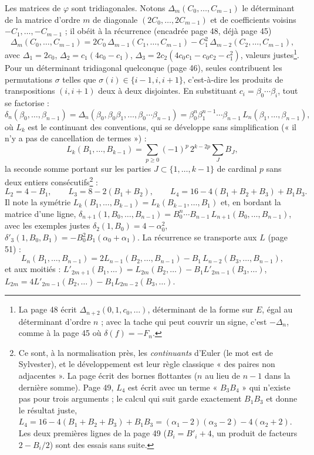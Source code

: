 \documentclass[11pt,a4paper]{article}
\begin{document}
Les matrices de $\varphi$ sont tridiagonales. Notons $\Delta_m(C_0, \ldots,
C_{m-1})$ le déterminant de la matrice d'ordre $m$ de diagonale $(2C_0, \ldots,
2C_{m-1})$ et de coefficients voisins $-C_1, \ldots, -C_{m-1}$ ; il obéit à la
récurrence (encadrée page 48, déjà page 45)
\[
\Delta_m(C_0, \ldots, C_{m-1}) = 2C_0\, \Delta_{m-1}(C_1, \ldots, C_{m-1}) -
C_1^2\, \Delta_{m-2}(C_2, \ldots, C_{m-1}),
\]
avec $\Delta_1 = 2c_0$, $\Delta_2 = c_1(4c_0 - c_1)$, $\Delta_3 = 2c_2(4c_0c_1 -
c_0c_2 - c_1^2)$, valeurs justes\footnote{La page 48 écrit
$\Delta_{n+2}(0, 1, c_0, \ldots)$, déterminant de la forme sur $E$, égal au
déterminant d'ordre $n$ ; avec la tache qui peut couvrir un signe, c'est
$-\Delta_n$, comme à la page 45 où $\delta(f) = -F_n$.}. Pour un déterminant
tridiagonal quelconque (page 46), seules contribuent les permutations $\sigma$
telles que $\sigma(i) \in \{i - 1, i, i + 1\}$, c'est-à-dire les produits de
transpositions $(i, i+1)$ deux à deux disjointes. En substituant $c_i = \beta_0
\cdots \beta_i$, tout se factorise :
\[
\delta_n(\beta_0, \ldots, \beta_{n-1}) = \Delta_n(\beta_0, \beta_0\beta_1,
\ldots, \beta_0 \cdots \beta_{n-1}) = \beta_0^n \beta_1^{n-1} \cdots
\beta_{n-1}\, L_n(\beta_1, \ldots, \beta_{n-1}),
\]
où $L_k$ est le continuant des conventions, qui se développe sans
simplification (« il n'y a pas de cancellation de termes ») :
\[
L_k(B_1, \ldots, B_{k-1}) = \sum_{p \geqslant 0} (-1)^p\, 2^{k - 2p}
\sum_{J} B_J ,
\]
la seconde somme portant sur les parties $J \subset \{1, \ldots, k-1\}$ de
cardinal $p$ sans deux entiers consécutifs\footnote{Ce sont, à la normalisation
près, les \emph{continuants} d'Euler (le mot est de Sylvester), et le
développement est leur règle classique « des paires non adjacentes ». La page
écrit des bornes flottantes ($n$ au lieu de $n-1$ dans la dernière somme).
Page 49, $L_4$ est écrit avec un terme « $B_3B_4$ » qui n'existe pas pour trois
arguments ; le calcul qui suit garde exactement $B_1B_3$ et donne le résultat
juste, $L_4 = 16 - 4(B_1 + B_2 + B_3) + B_1B_3 = (\alpha_1 - 2)(\alpha_3 - 2) -
4(\alpha_2 + 2)$. Les deux premières lignes de la page 49 ($B_i = B'_i + 4$, un
produit de facteurs $2 - B_i/2$) sont des essais sans suite.} :
\[
L_2 = 4 - B_1, \qquad L_3 = 8 - 2(B_1 + B_2), \qquad L_4 = 16 - 4(B_1 + B_2 +
B_3) + B_1B_3 .
\]
Il note la symétrie $L_k(B_1, \ldots, B_{k-1}) = L_k(B_{k-1}, \ldots, B_1)$ et,
en bordant la matrice d'une ligne, $\delta_{n+1}(1, B_0, \ldots, B_{n-1}) =
B_0^n \cdots B_{n-1}\, L_{n+1}(B_0, \ldots, B_{n-1})$, avec les exemples justes
$\delta_2(1, B_0) = 4 - \alpha_0^2$, $\delta'_3(1, B_0, B_1) = -B_0^2B_1(\alpha_0 +
\alpha_1)$. La récurrence se transporte aux $L$ (page 51) :
\[
L_n(B_1, \ldots, B_{n-1}) = 2L_{n-1}(B_2, \ldots, B_{n-1}) - B_1\,
L_{n-2}(B_3, \ldots, B_{n-1}),
\]
et aux moitiés : $L'_{2m+1}(B_1, \ldots) = L_{2m}(B_2, \ldots) - B_1
L'_{2m-1}(B_3, \ldots)$, $L_{2m} = 4L'_{2m-1}(B_2, \ldots) - B_1 L_{2m-2}(B_3,
\ldots)$.
\end{document}
